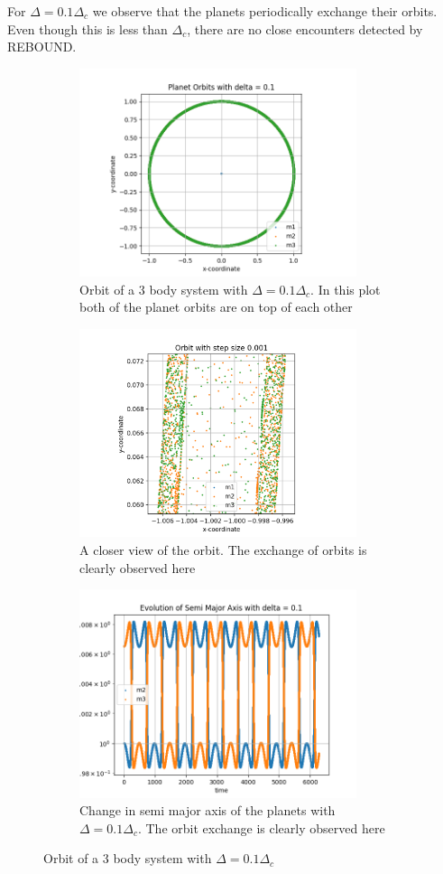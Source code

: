 \documentclass[12pt,a4paper]{article}
\begin{document}
For $\Delta=0.1\Delta_c$ we observe that the planets periodically exchange their orbits. Even though this is less than $\Delta_c$, there are no close encounters
detected by REBOUND.
\begin{figure}[H]
  \centering
  \begin{subfigure}{0.49\textwidth}
    \centering
    \includegraphics[height = 2.4in]{3Body/3BD_orbit_delta0.1.png}
    \caption{Orbit of a 3 body system with $\Delta = 0.1\Delta_c$. In this plot both of the planet orbits are on top of each other}
    \label{fig:3Body_0.1}
  \end{subfigure}
  \begin{subfigure}{0.49\textwidth}
    \centering
    \includegraphics[height = 2.4in]{3Body/3BD_orbit_delta0.1_Close.png}
    \caption{A closer view of the orbit. The exchange of orbits is clearly observed here}
    \label{fig:3Body_0.1_close}
  \end{subfigure}

  \begin{subfigure}{0.49\textwidth}
    \centering
    \includegraphics[height = 2.4in]{3Body/3BD_a_delta0.1.png}
    \caption{Change in semi major axis of the planets with $\Delta = 0.1\Delta_c$. The orbit exchange is clearly observed here}
    \label{fig:3Body_0.1_close}
  \end{subfigure}
  \caption{Orbit of a 3 body system with $\Delta = 0.1\Delta_c$}
\end{figure}
\end{document}
